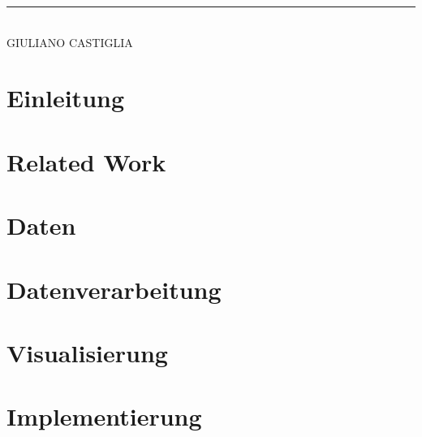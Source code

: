 \vspace{1cm}
\noindent\rule{5cm}{0.4pt}\\
GIULIANO CASTIGLIA

\clearpage




\tableofcontents



\cleardoublepage
{} %


\chapter{Einleitung}
\label{chap:einleitung}


\chapter{Related Work}
\label{chap:related_work}


\chapter{Daten}
\label{chap:daten}


\chapter{Datenverarbeitung}
\label{chap:daten_ver}


\chapter{Visualisierung}
\label{chap:visualization}


\chapter{Implementierung}
\label{chap:Implementierung}


